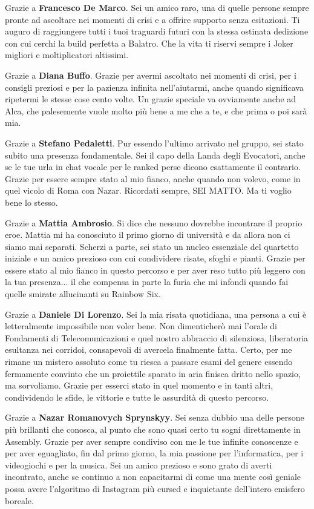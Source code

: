 Grazie a \textbf{Francesco De Marco}. Sei un amico raro, una di quelle persone sempre pronte ad ascoltare nei momenti di crisi e a offrire supporto senza esitazioni. Ti auguro di raggiungere tutti i tuoi traguardi futuri con la stessa ostinata dedizione con cui cerchi la build perfetta a Balatro. Che la vita ti riservi sempre i Joker migliori e moltiplicatori altissimi.

Grazie a \textbf{Diana Buffo}. Grazie per avermi ascoltato nei momenti di crisi, per i consigli preziosi e per la pazienza infinita nell'aiutarmi, anche quando significava ripetermi le stesse cose cento volte. Un grazie speciale va ovviamente anche ad Alca, che palesemente vuole molto più bene a me che a te, e che prima o poi sarà mia.

Grazie a \textbf{Stefano Pedaletti}. Pur essendo l'ultimo arrivato nel gruppo, sei stato subito una presenza fondamentale. Sei il capo della Landa degli Evocatori, anche se le tue urla in chat vocale per le ranked perse dicono esattamente il contrario. Grazie per essere sempre stato al mio fianco, anche quando non volevo, come in quel vicolo di Roma con Nazar. Ricordati sempre, SEI MATTO. Ma ti voglio bene lo stesso.

Grazie a \textbf{Mattia Ambrosio}. Si dice che nessuno dovrebbe incontrare il proprio eroe. Mattia mi ha conosciuto il primo giorno di università e da allora non ci siamo mai separati. Scherzi a parte, sei stato un nucleo essenziale del quartetto iniziale e un amico prezioso con cui condividere risate, sfoghi e pianti. Grazie per essere stato al mio fianco in questo percorso e per aver reso tutto più leggero con la tua presenza... il che compensa in parte la furia che mi infondi quando fai quelle smirate allucinanti su Rainbow Six.

Grazie a \textbf{Daniele Di Lorenzo}. Sei la mia risata quotidiana, una persona a cui è letteralmente impossibile non voler bene. Non dimenticherò mai l'orale di Fondamenti di Telecomunicazioni e quel nostro abbraccio di silenziosa, liberatoria esultanza nei corridoi, consapevoli di avercela finalmente fatta. Certo, per me rimane un mistero assoluto come tu riesca a passare esami del genere essendo fermamente convinto che un proiettile sparato in aria finisca dritto nello spazio, ma sorvoliamo. Grazie per esserci stato in quel momento e in tanti altri, condividendo le sfide, le vittorie e tutte le assurdità di questo percorso.

Grazie a \textbf{Nazar Romanovych Sprynskyy}. Sei senza dubbio una delle persone più brillanti che conosca, al punto che sono quasi certo tu sogni direttamente in Assembly. Grazie per aver sempre condiviso con me le tue infinite conoscenze e per aver eguagliato, fin dal primo giorno, la mia passione per l'informatica, per i videogiochi e per la musica. Sei un amico prezioso e sono grato di averti incontrato, anche se continuo a non capacitarmi di come una mente così geniale possa avere l'algoritmo di Instagram più cursed e inquietante dell'intero emisfero boreale.

